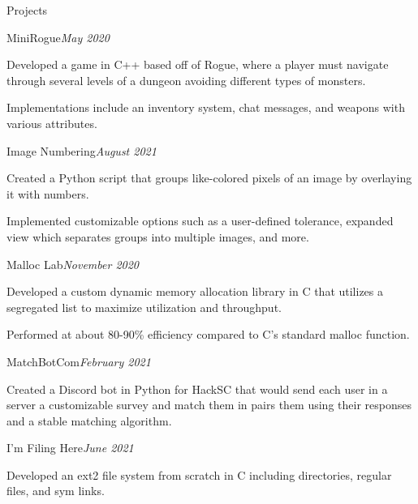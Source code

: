 \documentclass{resume} %
\begin{document}

\begin{rSection}{Projects}

\begin{rSubsection}{MiniRogue}{\em May 2020}{}{}
\item Developed a game in C++ based off of Rogue, where a player must navigate through several levels of a dungeon avoiding different types of monsters.
\item Implementations include an inventory system, chat messages, and weapons with various attributes.
\end{rSubsection}

\begin{rSubsection}{Image Numbering}{\em August 2021}{}{}
\item Created a Python script that groups like-colored pixels of an image by overlaying it with numbers.
\item Implemented customizable options such as a user-defined tolerance, expanded view which separates groups into multiple images, and more.
\end{rSubsection}

\begin{rSubsection}{Malloc Lab}{\em November 2020}{}{}
\item Developed a custom dynamic memory allocation library in C that utilizes a segregated list to maximize utilization and throughput.
\item Performed at about 80-90\% efficiency compared to C's standard malloc function.
\end{rSubsection}

\begin{rSubsection}{MatchBotCom}{\em February 2021}{}{}
\item Created a Discord bot in Python for HackSC that would send each user in a server a customizable survey and match them in pairs them using their responses and a stable matching algorithm.
\end{rSubsection}


\begin{rSubsection}{I'm Filing Here}{\em June 2021}{}{}
\item Developed an ext2 file system from scratch in C including directories, regular files, and sym links.
\end{rSubsection}

\end{rSection}
\end{document}
